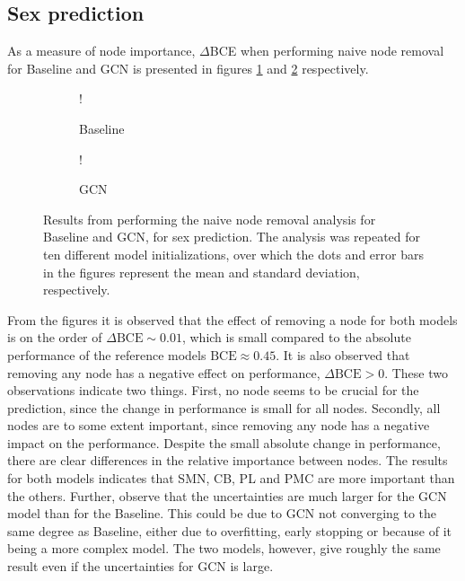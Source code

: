 \subsection{Sex prediction}
\label{sec:results_analysis_sex}
As a measure of node importance, $\Delta$BCE when performing naive node removal for Baseline and GCN is presented in figures \ref{fig:naive_sex_baseline} and \ref{fig:naive_sex_gcn} respectively.

\begin{figure}[H]
    \centering
        \begin{subfigure}{.5\textwidth}
            \centering
            \begin{center}
                \resizebox {1.0\linewidth} {!} {
                    
                }
            \end{center}
            \caption{Baseline}
            \label{fig:naive_sex_baseline}
        \end{subfigure}%
        \begin{subfigure}{.5\textwidth}
            \centering
            \begin{center}
                \resizebox {1.0\linewidth} {!} {
                    
                }
            \end{center}
            \caption{GCN}
            \label{fig:naive_sex_gcn}
        \end{subfigure}
    \caption{Results from performing the naive node removal analysis for Baseline and GCN, for sex prediction. The analysis was repeated for ten different model initializations, over which the dots and error bars in the figures represent the mean and standard deviation, respectively.}
    \label{fig:naive_sex}
\end{figure}

From the figures it is observed that the effect of removing a node for both models is on the order of $\Delta \text{BCE} \sim 0.01$, which is small compared to the absolute performance of the reference models $\text{BCE} \approx 0.45$. It is also observed that removing any node has a negative effect on performance, $\Delta\text{BCE}>0$. These two observations indicate two things. First, no node seems to be crucial for the prediction, since the change in performance is small for all nodes. Secondly, all nodes are to some extent important, since removing any node has a negative impact on the performance. Despite the small absolute change in performance, there are clear differences in the relative importance between nodes. The results for both models indicates that SMN, CB, PL and PMC are more important than the others. Further, observe that the uncertainties are much larger for the GCN model than for the Baseline. This could be due to GCN not converging to the same degree as Baseline, either due to overfitting, early stopping or because of it being a more complex model. The two models, however, give roughly the same result even if the uncertainties for GCN is large. 


